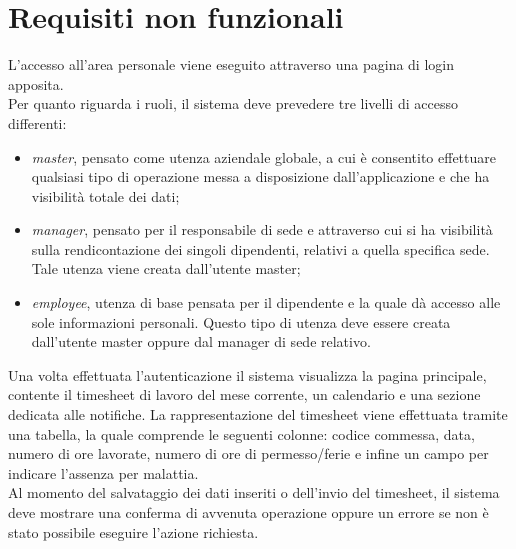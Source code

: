 \section{Requisiti non funzionali}
L'accesso all'area personale viene eseguito attraverso una pagina di login apposita. \\
Per quanto riguarda i ruoli, il sistema deve prevedere tre livelli di accesso differenti: 
\begin{itemize}
    \item \textit{master}, pensato come utenza aziendale globale, a cui è consentito effettuare qualsiasi tipo di operazione messa a disposizione dall'applicazione e che ha visibilità totale dei dati;
    \item \textit{manager}, pensato per il responsabile di sede e attraverso cui si ha visibilità sulla rendicontazione dei singoli dipendenti, relativi a quella specifica sede. Tale utenza viene creata dall'utente master;
    \item \textit{employee}, utenza di base pensata per il dipendente e la quale dà accesso alle sole informazioni personali. Questo tipo di utenza deve essere creata dall'utente master oppure dal manager di sede relativo.
\end{itemize}
Una volta effettuata l'autenticazione il sistema visualizza la pagina principale, contente il timesheet di lavoro del mese corrente, un calendario e una sezione dedicata alle notifiche. La rappresentazione del timesheet viene effettuata tramite una tabella, la quale comprende le seguenti colonne: codice commessa, data, numero di ore lavorate, numero di ore di permesso/ferie e infine un campo per indicare l'assenza per malattia. \\
Al momento del salvataggio dei dati inseriti o dell'invio del timesheet, il sistema deve mostrare una conferma di avvenuta operazione oppure un errore se non è stato possibile eseguire l'azione richiesta.